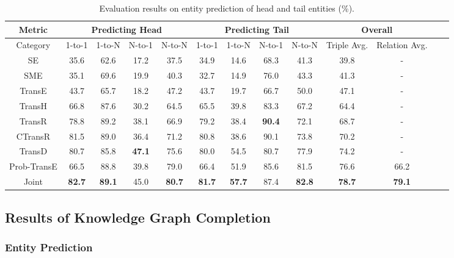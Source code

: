 \documentclass[11pt,a4paper]{article}
\begin{document}
\begin{table}[t]
\centering
\small
\begin{tabular}{|c|cccc|cccc|c|c|c|c|}
\hline
Metric            & \multicolumn{4}{c|}{Predicting Head} & \multicolumn{4}{c|}{Predicting Tail} & \multicolumn{2}{c|}{Overall} \\ \hline
      Category            & 1-to-1     & 1-to-N    & N-to-1    & N-to-N    & 1-to-1     & 1-to-N    & N-to-1    & N-to-N  & Triple Avg. & Relation Avg. \\ \hline

SE &35.6 &62.6 &17.2 &37.5 &34.9 &14.6 &68.3 &41.3 &39.8 & - \\ 
SME &35.1 &69.6 &19.9 &40.3 &32.7 &14.9 &76.0 &43.3 &41.3 & - \\ 
TransE            & 43.7       & 65.7      & 18.2      & 47.2      & 43.7       & 19.7      & 66.7      & 50.0    & 47.1 & - \\ 
TransH     & 66.8       & 87.6      & 30.2      & 64.5      & 65.5       & 39.8      & 83.3      & 67.2    & 64.4 & - \\ 
TransR     & 78.8       & 89.2      & 38.1      & 66.9      & 79.2       & 38.4      &\textbf{90.4}      & 72.1    & 68.7 & - \\ 
CTransR     & 81.5      & 89.0      & 36.4      & 71.2      & 80.8       & 38.6      &90.1      & 73.8    & 70.2 & - \\ 

TransD  &80.7  &85.8  &\textbf{47.1} &75.6  &80.0 &54.5 &80.7 &77.9  &74.2 &- \\ \hline


Prob-TransE      & 66.5       & 88.8      & 39.8      & 79.0      & 66.4       & 51.9      & 85.6      & 81.5    & 76.6 & 66.2 \\ 
Joint             & \textbf{82.7}& \textbf{89.1} &45.0 & \textbf{80.7}& \textbf{81.7}& \textbf{57.7}& 87.4&\textbf{82.8} & \textbf{78.7} & \textbf{79.1} \\ \hline
\end{tabular}
\caption{Evaluation results on entity prediction of head and tail entities (\%).}
\label{t:entity}
\end{table}


\subsection{Results of Knowledge Graph Completion}

\subsubsection{Entity Prediction}
\end{document}
